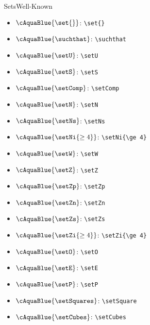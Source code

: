 \documentclass[\string~/GitHub/sthlmNordBeamerTheme/sthlmNordLightDemo.tex]{subfiles}
\begin{document}
\begin{frame}[fragile]{Sets}{Well-Known}
	\hfill\\
	\begin{minipage}[t]{0.3\textwidth}
		\vspace{0pt}
		\begin{itemize}
			\item \(\cAquaBlue{ \set{} } \): \verb!\set{}!
			\item \(\cAquaBlue{ \suchthat } \): \verb!\suchthat!
			\item \(\cAquaBlue{ \setU } \): \verb!\setU!
			\item \(\cAquaBlue{ \setS } \): \verb!\setS!
			\item \(\cAquaBlue{ \setComp } \): \verb!\setComp!
			\item \(\cAquaBlue{ \setN } \): \verb!\setN!
			\item \(\cAquaBlue{ \setNs } \): \verb!\setNs!
			\item \(\cAquaBlue{ \setNi{\ge 4} } \): \verb!\setNi{\ge 4}!
			\item \(\cAquaBlue{ \setW } \): \verb!\setW!
		\end{itemize}
	\end{minipage}
	\begin{minipage}[t]{0.3\textwidth}
		\vspace{0pt}
		\begin{itemize}
			\item \(\cAquaBlue{ \setZ } \): \verb!\setZ!
			\item \(\cAquaBlue{ \setZp } \): \verb!\setZp!
			\item \(\cAquaBlue{ \setZn } \): \verb!\setZn!
			\item \(\cAquaBlue{ \setZs } \): \verb!\setZs!
			\item \(\cAquaBlue{ \setZi{\ge 4} } \): \verb!\setZi{\ge 4}!
			\item \(\cAquaBlue{ \setO } \): \verb!\setO!
			\item \(\cAquaBlue{ \setE } \): \verb!\setE!
			\item \(\cAquaBlue{ \setP } \): \verb!\setP!
			\item \(\cAquaBlue{ \setSquares } \): \verb!\setSquare!
			\item \(\cAquaBlue{ \setCubes } \): \verb!\setCubes!
		\end{itemize}
	\end{minipage}

\end{frame}
\end{document}
